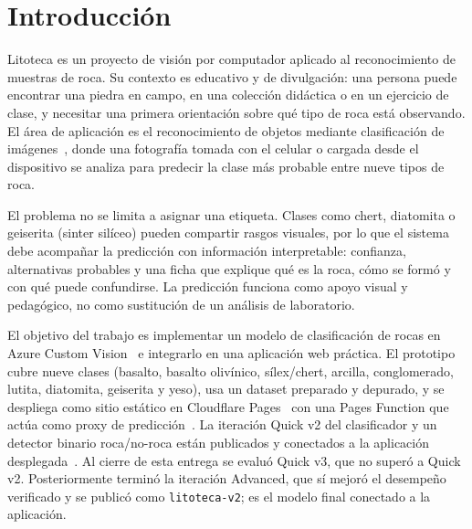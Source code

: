 \section{Introducción}
\label{sec:intro}

Litoteca es un proyecto de visión por computador aplicado al reconocimiento de
muestras de roca. Su contexto es educativo y de divulgación: una persona puede
encontrar una piedra en campo, en una colección didáctica o en un ejercicio de
clase, y necesitar una primera orientación sobre qué tipo de roca está observando.
El área de aplicación es el reconocimiento de objetos mediante clasificación de
imágenes~\cite{lecun2015deep}, donde una fotografía tomada con el celular o cargada
desde el dispositivo se analiza para predecir la clase más probable entre nueve
tipos de roca.

El problema no se limita a asignar una etiqueta. Clases como chert, diatomita o
geiserita (sinter silíceo) pueden compartir rasgos visuales, por lo que el sistema
debe acompañar la predicción con información interpretable: confianza, alternativas
probables y una ficha que explique qué es la roca, cómo se formó y con qué puede
confundirse. La predicción funciona como apoyo visual y pedagógico, no como
sustitución de un análisis de laboratorio.

El objetivo del trabajo es implementar un modelo de clasificación de rocas en
Azure Custom Vision~\cite{azurecustomvision} e integrarlo en una aplicación web
práctica. El prototipo cubre nueve clases (basalto, basalto olivínico, sílex/chert,
arcilla, conglomerado, lutita, diatomita, geiserita y yeso), usa un dataset
preparado y depurado, y se despliega como sitio estático en Cloudflare
Pages~\cite{cloudflarepages} con una Pages Function que actúa como proxy de
predicción~\cite{cloudflarefunctions}. La iteración Quick v2 del clasificador y un
detector binario roca/no-roca están publicados y conectados a la aplicación
desplegada~\cite{litotecaapp,litotecarepo}. Al cierre de esta entrega se evaluó
Quick v3, que no superó a Quick v2. Posteriormente terminó la iteración Advanced,
que sí mejoró el desempeño verificado y se publicó como \texttt{litoteca-v2}; es el
modelo final conectado a la aplicación.
